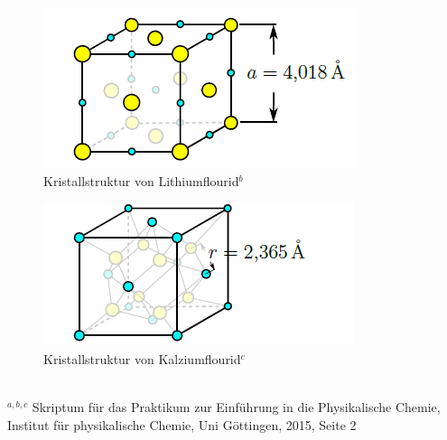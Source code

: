 \documentclass[12pt,a4paper,titlepage,headinclude,bibtotoc]{scrartcl}
\begin{document}
\begin{figure} [h]
\begin{center}
\includegraphics[scale=0.7]{Lithiumflourid.png} \end{center}
\caption{Kristallstruktur von Lithiumflourid$^b$}
\end{figure}

\begin{figure} [h]
\begin{center}
\includegraphics[scale=0.7]{Calciumflourid.png} \end{center}
\caption{Kristallstruktur von Kalziumflourid$^c$}
\end{figure}

\hrulefill\\
$^{a,b,c}$ Skriptum für das Praktikum zur Einführung in die Physikalische Chemie, Institut für physikalische Chemie, Uni Göttingen, 2015, Seite 2
\end{document}

